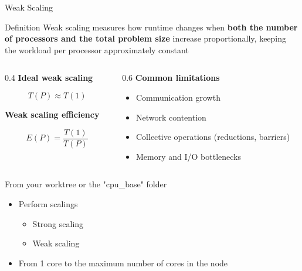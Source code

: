 \documentclass[
    aspectratio=169,
]{beamer}
\begin{document}
\begin{frame}[fragile]{Weak Scaling}

\begin{block}{Definition}
Weak scaling measures how runtime changes when \textbf{both the number of processors
and the total problem size} increase proportionally, keeping the workload per
processor approximately constant
\end{block}

\vspace{0.5em}

\begin{columns}
    \begin{column}{0.4\linewidth}
        \textbf{Ideal weak scaling}

        \[
        T(P) \approx T(1)
        \]

        \textbf{Weak scaling efficiency}

        \[
        E(P) = \frac{T(1)}{T(P)}
        \]
    \end{column}
    \begin{column}{0.6\linewidth}
        \textbf{Common limitations}
        \begin{itemize}
            \item Communication growth
            \item Network contention
            \item Collective operations (reductions, barriers)
            \item Memory and I/O bottlenecks
        \end{itemize}
    \end{column}
\end{columns}

\end{frame}

\begin{exerciseframe}{\small From your worktree or the "cpu\_base" folder}
    \begin{itemize}
        \item Perform scalings
        \begin{itemize}
            \item Strong scaling
            \item Weak scaling
        \end{itemize}
        \item From 1 core to the maximum number of cores in the node
    \end{itemize}
\end{exerciseframe}
\end{document}
